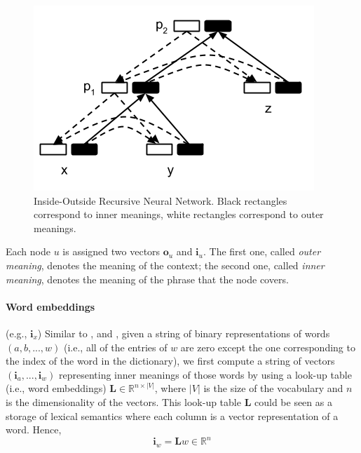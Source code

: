 \documentclass[11pt]{article}
\begin{document}
\begin{figure}[h!]
	\center
	\includegraphics[scale=0.5]{IORNN.png}
	\caption{Inside-Outside Recursive Neural Network. Black rectangles correspond to inner meanings, 
	white rectangles correspond to outer meanings.}
	\label{figure iornn}
\end{figure}


Each node $u$ is assigned two vectors $\mathbf{o}_u$ and $\mathbf{i}_u$. The first one,
called \textit{outer meaning}, denotes the meaning of the context; the second one, 
called \textit{inner meaning}, denotes the meaning of the phrase that the node covers.

\paragraph{Word embeddings} (e.g., $\mathbf{i}_x$)
Similar to \cite{socher_learning_2010}, and \cite{collobert_natural_2011}, given a string of binary
representations of words $(a, b, ..., w)$ (i.e., all of the entries of $w$ are zero except the one 
corresponding to the index of the word in the dictionary), 
we first compute a string of vectors $(\mathbf{i}_{a},...,\mathbf{i}_{w})$ 
representing inner meanings of those words by using 
a look-up table (i.e., word embeddings) $\mathbf{L} \in \mathbb{R}^{n \times |V|}$, 
where $|V|$ is the size of the vocabulary and $n$ is the dimensionality of the vectors. 
This look-up table $\mathbf{L}$ could be seen as a storage of lexical semantics where each column 
is a vector representation of a word. Hence, 
\begin{equation}
    \label{equation compute word vector}
    \mathbf{i}_{w} = \mathbf{L} w \in \mathbb{R}^n
\end{equation}
\end{document}
